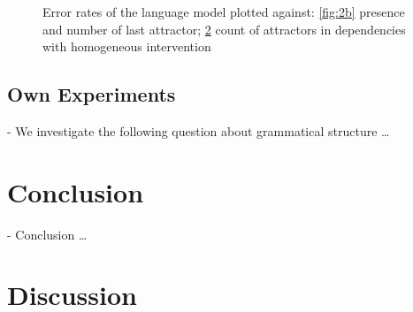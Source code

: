 \documentclass[twoside]{article}
\begin{document}
\begin{figure}
\begin{subfigure}[b]{0.4\textwidth}
        \label{fig:2c}
    \end{subfigure}
    \caption{Error rates of the language model plotted against: \ref{fig:2b} presence and number of last attractor; \ref{fig:2c} count of attractors in dependencies with homogeneous intervention}
\end{figure}

\begin{multicols}{2}



\subsection{Own Experiments}
\label{own-experiments}

- We investigate the following question about grammatical structure \ldots

\section{Conclusion}
\label{conclusion}

- Conclusion \ldots

\section{Discussion}









\end{multicols}
\end{document}
